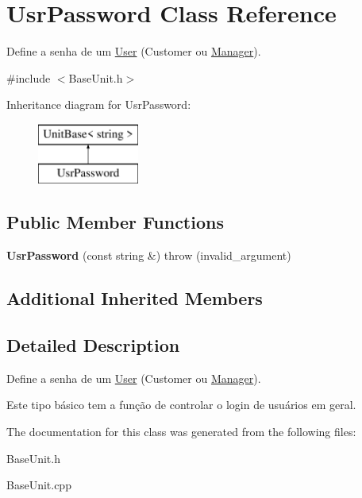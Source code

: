 \hypertarget{classUsrPassword}{\section{Usr\-Password Class Reference}
\label{classUsrPassword}
}


Define a senha de um \hyperlink{classUser}{User} (Customer ou \hyperlink{classManager}{Manager}).  




{\ttfamily \#include $<$Base\-Unit.\-h$>$}

Inheritance diagram for Usr\-Password\-:\begin{figure}[H]
\begin{center}
\leavevmode
\includegraphics[height=2.000000cm]{classUsrPassword}
\end{center}
\end{figure}
\subsection*{Public Member Functions}
\begin{DoxyCompactItemize}
\item 
\hypertarget{classUsrPassword_ab99c93719778f9560712675b1febb3cb}{{\bfseries Usr\-Password} (const string \&)  throw (invalid\-\_\-argument)}\label{classUsrPassword_ab99c93719778f9560712675b1febb3cb}

\end{DoxyCompactItemize}
\subsection*{Additional Inherited Members}


\subsection{Detailed Description}
Define a senha de um \hyperlink{classUser}{User} (Customer ou \hyperlink{classManager}{Manager}). 

Este tipo básico tem a função de controlar o login de usuários em geral. 

The documentation for this class was generated from the following files\-:\begin{DoxyCompactItemize}
\item 
Base\-Unit.\-h\item 
Base\-Unit.\-cpp\end{DoxyCompactItemize}
